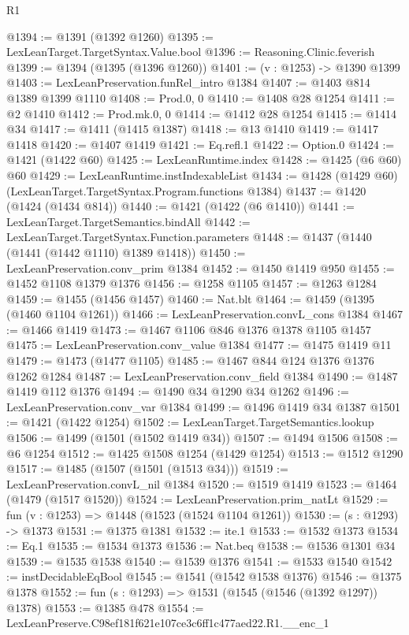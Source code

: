 \begin{lexlean}{R1}
\begin{coremodule}
@1394 := @1391 (@1392 @1260)
@1395 := LexLeanTarget.TargetSyntax.Value.bool
@1396 := Reasoning.Clinic.feverish
@1399 := @1394 (@1395 (@1396 @1260))
@1401 := (v : @1253) -> @1390 @1399
@1403 := LexLeanPreservation.funRel_intro @1384
@1407 := @1403 @814 @1389 @1399 @1110
@1408 := Prod.{0, 0}
@1410 := @1408 @28 @1254
@1411 := @2 @1410
@1412 := Prod.mk.{0, 0}
@1414 := @1412 @28 @1254
@1415 := @1414 @34
@1417 := @1411 (@1415 @1387)
@1418 := @13 @1410
@1419 := @1417 @1418
@1420 := @1407 @1419
@1421 := Eq.refl.{1}
@1422 := Option.{0}
@1424 := @1421 (@1422 @60)
@1425 := LexLeanRuntime.index
@1428 := @1425 (@6 @60) @60
@1429 := LexLeanRuntime.instIndexableList
@1434 := @1428 (@1429 @60) (LexLeanTarget.TargetSyntax.Program.functions @1384)
@1437 := @1420 (@1424 (@1434 @814))
@1440 := @1421 (@1422 (@6 @1410))
@1441 := LexLeanTarget.TargetSemantics.bindAll
@1442 := LexLeanTarget.TargetSyntax.Function.parameters
@1448 := @1437 (@1440 (@1441 (@1442 @1110) @1389 @1418))
@1450 := LexLeanPreservation.conv_prim @1384
@1452 := @1450 @1419 @950
@1455 := @1452 @1108 @1379 @1376
@1456 := @1258 @1105
@1457 := @1263 @1284
@1459 := @1455 (@1456 @1457)
@1460 := Nat.blt
@1464 := @1459 (@1395 (@1460 @1104 @1261))
@1466 := LexLeanPreservation.convL_cons @1384
@1467 := @1466 @1419
@1473 := @1467 @1106 @846 @1376 @1378 @1105 @1457
@1475 := LexLeanPreservation.conv_value @1384
@1477 := @1475 @1419 @11
@1479 := @1473 (@1477 @1105)
@1485 := @1467 @844 @124 @1376 @1376 @1262 @1284
@1487 := LexLeanPreservation.conv_field @1384
@1490 := @1487 @1419 @112 @1376
@1494 := @1490 @34 @1290 @34 @1262
@1496 := LexLeanPreservation.conv_var @1384
@1499 := @1496 @1419 @34 @1387
@1501 := @1421 (@1422 @1254)
@1502 := LexLeanTarget.TargetSemantics.lookup
@1506 := @1499 (@1501 (@1502 @1419 @34))
@1507 := @1494 @1506
@1508 := @6 @1254
@1512 := @1425 @1508 @1254 (@1429 @1254)
@1513 := @1512 @1290
@1517 := @1485 (@1507 (@1501 (@1513 @34)))
@1519 := LexLeanPreservation.convL_nil @1384
@1520 := @1519 @1419
@1523 := @1464 (@1479 (@1517 @1520))
@1524 := LexLeanPreservation.prim_natLt
@1529 := fun (v : @1253) => @1448 (@1523 (@1524 @1104 @1261))
@1530 := (s : @1293) -> @1373
@1531 := @1375 @1381
@1532 := ite.{1}
@1533 := @1532 @1373
@1534 := Eq.{1}
@1535 := @1534 @1373
@1536 := Nat.beq
@1538 := @1536 @1301 @34
@1539 := @1535 @1538
@1540 := @1539 @1376
@1541 := @1533 @1540
@1542 := instDecidableEqBool
@1545 := @1541 (@1542 @1538 @1376)
@1546 := @1375 @1378
@1552 := fun (s : @1293) => @1531 (@1545 (@1546 (@1392 @1297)) @1378)
@1553 := @1385 @478
@1554 := LexLeanPreserve.C98ef181f621e107ce3c6ff1c477aed22.R1.__enc_1

\end{coremodule}
\end{lexlean}
